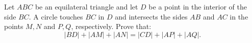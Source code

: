 Let $ABC$ be an equilateral triangle and let $D$ be a point in the interior of the side $BC$.
A circle touches $BC$ in $D$ and intersects the sides $AB$ and $AC$ in the points $M, N$ and $P,Q$,
respectively. Prove that:
$$|BD|+|AM|+|AN| = |CD|+|AP|+|AQ|.$$